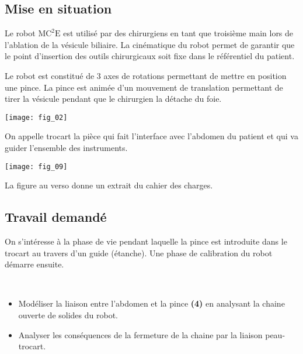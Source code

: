 \begin{multicols}{2}
\section*{Mise en situation}
\ifprof
\else
Le robot $\text{MC}^2\text{E}$ est utilisé par des chirurgiens en tant que troisième main lors de l'ablation de la vésicule biliaire. La cinématique du robot permet de garantir que le point d'insertion des outils chirurgicaux soit fixe dans le référentiel du patient. 

Le robot est constitué de 3 axes de rotations permettant de mettre en position une pince. La pince est animée d'un mouvement de translation permettant de tirer la vésicule pendant que le chirurgien la détache du foie. 

\begin{center}
\texttt{[image: fig\_02]}
\end{center}

On appelle trocart la pièce qui fait l'interface avec l'abdomen du patient et qui va guider l'ensemble des instruments. 

\begin{center}
\texttt{[image: fig\_09]}
\end{center}


La figure au verso donne un extrait du cahier des charges. 

\fi

\subsection*{Travail demandé}
On s'intéresse à la phase de vie pendant laquelle la pince est introduite dans le trocart au travers d’un guide (étanche). Une phase de calibration du robot démarre ensuite. 
\begin{obj} ~\\
\vspace{-.5cm}
\begin{itemize}
\item Modéliser la liaison entre l’abdomen et la pince \textbf{(4)} en analysant la chaine ouverte de solides du robot.
\item Analyser les conséquences de la fermeture de la chaine par la liaison peau-trocart.
\end{itemize}
\end{obj}


\end{multicols}
